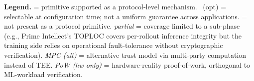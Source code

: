 \documentclass[11pt]{article}
\begin{document}
\begin{table}[h]
\centering
\footnotesize
\setlength{\tabcolsep}{4pt}
\end{table}

\textbf{Legend.} \checkmark{} = primitive supported as a protocol-level mechanism. \checkmark{}~(opt) = selectable at configuration time; not a uniform guarantee across applications.  = not present as a protocol primitive. \emph{partial} = coverage limited to a sub-phase (e.g., Prime Intellect's TOPLOC covers per-rollout inference integrity but the training side relies on operational fault-tolerance without cryptographic verification). \emph{MPC (alt)} = alternative trust model via multi-party computation instead of TEE. \emph{PoW (hw only)} = hardware-reality proof-of-work, orthogonal to ML-workload verification.
\end{document}
